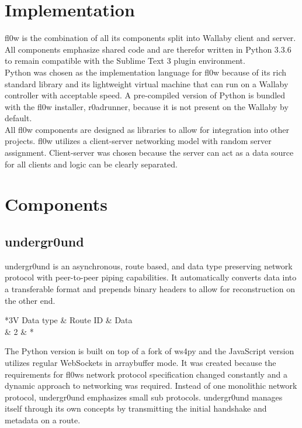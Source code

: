 \documentclass[conference,a4paper]{IEEEtran}
\begin{document}
\section{Implementation}
fl0w is the combination of all its components split into Wallaby\cite{Wallaby Controller:KIPR} client and server. All components emphasize shared code and are therefor written in Python\cite{Python:Python Foundation} 3.3.6 to remain compatible with the Sublime Text 3 plugin environment. \\Python was chosen as the implementation language for fl0w because of its rich standard library and its lightweight virtual machine that can run on a Wallaby controller with acceptable speed. A pre-compiled version of Python is bundled with the fl0w installer, r0adrunner, because it is not present on the Wallaby by default. \\All fl0w components are designed as libraries to allow for integration into other projects. fl0w utilizes a client-server networking model with random server assignment. Client-server was chosen because the server can act as a data source for all clients and logic can be clearly separated.

\section{Components}

\subsection{undergr0und}
undergr0und\cite{undergr0und:Philip Trauner} is an asynchronous, route based, and data type preserving network protocol with peer-to-peer piping capabilities.
It automatically converts data into a transferable format and prepends binary headers to allow for reconstruction on the other end.

\begin{table}[H]
\caption{The binary encoding of messages in undergr0und (in bytes)}
\centering
	\begin{tabular}{*{3}{V}}
		Data type & Route ID & Data \\  & 2 & * \\
	\end{tabular}
\label{fig:undergr0und_header}
\end{table}


The Python version is built on top of a fork of ws4py\cite{ws4py:Philip Trauner} and the JavaScript\cite{ECMAScript:Ecma} version utilizes regular WebSockets\cite{The WebSocket Protocol:A. Melnikov} in arraybuffer mode. It was created because the requirements for fl0ws network protocol specification changed constantly and a dynamic approach to networking was required. Instead of one monolithic network protocol, undergr0und emphasizes small sub protocols. undergr0und manages itself through its own concepts by transmitting the initial handshake and metadata on a route.\\
\end{document}
